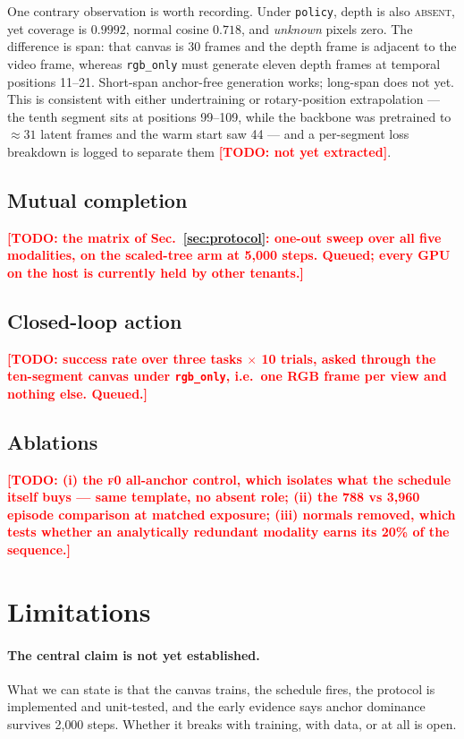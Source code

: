\documentclass{article}
\newcommand{\TODO}[1]{\textcolor{red}{\textbf{[TODO: #1]}}}
\begin{document}
One contrary observation is worth recording. Under \texttt{policy}, depth is also
\textsc{absent}, yet coverage is $0.9992$, normal cosine $0.718$, and \emph{unknown} pixels zero.
The difference is span: that canvas is 30 frames and the depth frame is adjacent to the video
frame, whereas \texttt{rgb\_only} must generate eleven depth frames at temporal positions
11--21. Short-span anchor-free generation works; long-span does not yet. This is consistent with
either undertraining or rotary-position extrapolation --- the tenth segment sits at positions
99--109, while the backbone was pretrained to $\approx\!31$ latent frames and the warm start saw
44 --- and a per-segment loss breakdown is logged to separate them \TODO{not yet extracted}.

\subsection{Mutual completion}
\TODO{the matrix of Sec.~\ref{sec:protocol}: one-out sweep over all five modalities, on the
scaled-tree arm at 5{,}000 steps. Queued; every GPU on the host is currently held by other
tenants.}

\subsection{Closed-loop action}
\TODO{success rate over three tasks $\times$ 10 trials, asked through the ten-segment canvas
under \texttt{rgb\_only}, i.e.\ one RGB frame per view and nothing else. Queued.}

\subsection{Ablations}
\TODO{(i) the \textsc{f0} all-anchor control, which isolates what the schedule itself buys ---
same template, no absent role; (ii) the 788 vs 3{,}960 episode comparison at matched exposure;
(iii) normals removed, which tests whether an analytically redundant modality earns its 20\% of
the sequence.}

\section{Limitations}
\label{sec:limitations}

\paragraph{The central claim is not yet established.} What we can state is that the canvas
trains, the schedule fires, the protocol is implemented and unit-tested, and the early evidence
says anchor dominance survives 2{,}000 steps. Whether it breaks with training, with data, or at
all is open.
\end{document}
